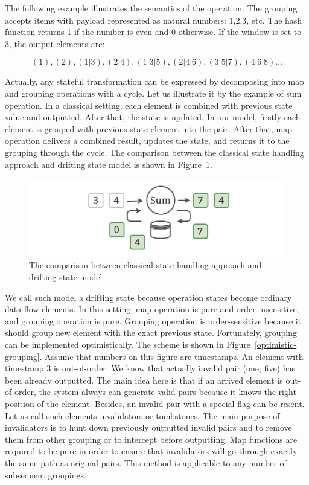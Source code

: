 The following example illustrates the semantics of the operation. The grouping accepts items with payload represented as natural numbers: 1,2,3, etc. The hash function returns 1 if the number is even and 0 otherwise. If the window is set to 3, the output elements are:

\[(1), (2), (1|3), (2|4), (1|3|5), (2|4|6), (3|5|7), (4|6|8)...\]

Actually, any stateful transformation can be expressed by decomposing into map and grouping operations with a cycle. Let us illustrate it by the example of sum operation. In a classical setting, each element is combined with previous state value and outputted. After that, the state is updated. In our model, firstly each element is grouped with previous state element into the pair. After that, map operation delivers a combined result, updates the state, and returns it to the grouping through the cycle. The comparison between the classical state handling approach and drifting state model is shown in Figure~\ref{classical-drifting}.

\begin{figure}[htbp]
  \centering
  \includegraphics[width=.49\textwidth]{pics/classical-drifting}
  \caption{The comparison between classical state handling approach and drifting state model}
  \label {classical-drifting}
\end{figure}

We call such model a drifting state because operation states become ordinary data flow elements. In this setting, map operation is pure and order insensitive, and grouping operation is pure. Grouping operation is order-sensitive because it should group new element with the exact previous state. Fortunately, grouping can be implemented optimistically. The scheme is shown in Figure~\ref{optimistic-grouping}. Assume that numbers on this figure are timestamps. An element with timestamp 3 is out-of-order. We know that actually invalid pair (one; five) has been already outputted. The main idea here is that if an arrived element is out-of-order, the system always can generate valid pairs because it knows the right position of the element. Besides, an invalid pair with a special flag can be resent. Let us call such elements invalidators or tombstones. The main purpose of invalidators is to hunt down previously outputted invalid pairs and to remove them from other grouping or to intercept before outputting. Map functions are required to be pure in order to ensure that invalidators will go through exactly the same path as original pairs. This method is applicable to any number of subsequent groupings.
 
